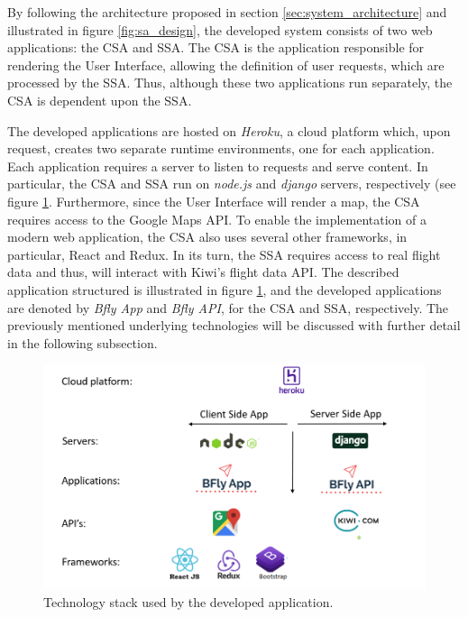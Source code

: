 By following the architecture proposed in section \ref{sec:system_architecture} and illustrated in figure \ref{fig:sa_design}, the developed system consists of two web applications: the CSA and SSA. The CSA is the application responsible for rendering the User Interface, allowing the definition of user requests, which are processed by the SSA. Thus, although these two applications run separately, the CSA is dependent upon the SSA. 



The developed applications are hosted on \textit{Heroku}, a cloud platform which, upon request, creates two separate runtime environments, one for each application. Each application requires a server to listen to requests and serve content. In particular, the CSA and SSA run on \textit{node.js} and \textit{django} servers, respectively (see figure \ref{fig:sa_structure}. Furthermore, since the User Interface will render a map, the CSA requires access to the Google Maps API. To enable the implementation of a modern web application, the CSA also uses several other frameworks, in particular, React and Redux. In its turn, the SSA requires access to real flight data and thus, will interact with Kiwi's flight data API. The described application structured is illustrated in figure \ref{fig:sa_structure}, and the developed applications are denoted by \textit{Bfly App} and \textit{Bfly API}, for the CSA and SSA, respectively. The previously mentioned underlying technologies will be discussed with further detail in the following subsection.  



\begin{figure}[htpb]
  \centering
  \includegraphics[width=.7\textwidth]{./Figures/system_implementation/system_architecture_implementation.png}
  \caption{Technology stack used by the developed application.}
  \label{fig:sa_structure}  
\end{figure}


